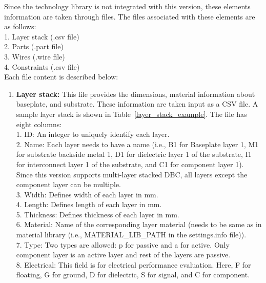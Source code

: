 \documentclass[11pt]{article}
\begin{document}
Since the technology library is not integrated with this version, these elements information are taken through files. The files associated with these elements are as follows:\\
1. Layer stack (.csv file)\\
2. Parts (.part file)\\
3. Wires (.wire file)\\
4. Constraints (.csv file)\\
Each file content is described below:
\begin{enumerate}

\item \textbf{Layer stack:} This file provides the dimensions, material information about baseplate, and substrate. These information are taken input as a CSV file. A sample layer stack is shown in Table~\ref{layer_stack_example}. The file has eight columns:\\
    1. ID: An integer to uniquely identify each layer.\\
    2. Name: Each layer needs to have a name (i.e., B1 for Baseplate layer 1, M1 for substrate backside metal 1, D1 for dielectric layer 1 of the substrate, I1 for interconnect layer 1 of the substrate, and C1 for component layer 1). Since this version supports multi-layer stacked DBC, all layers except the component layer can be multiple.\\
    3. Width: Defines width of each layer in mm.\\
    4. Length: Defines length of each layer in mm.\\
    5. Thickness: Defines thickness of each layer in mm.\\
    6. Material: Name of the corresponding layer material (needs to be same as in material library (i.e., MATERIAL\_LIB\_PATH in the settings.info file)).\\
    7. Type: Two types are allowed: p for passive and a for active. Only component layer is an active layer and rest of the layers are passive.\\
    8. Electrical: This field is for electrical performance evaluation. Here, F for floating, G for ground, D for dielectric, S for signal, and C for component.




\end{enumerate}
\end{document}
